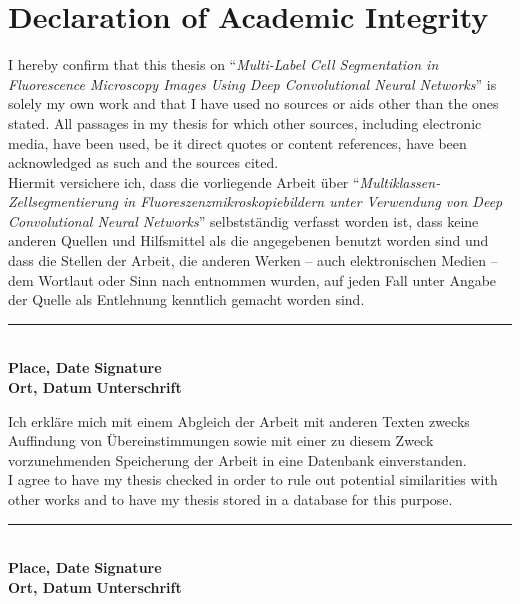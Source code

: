 \chapter* {Declaration of Academic Integrity}

I hereby confirm that this thesis on ``\textit{Multi-Label Cell Segmentation in Fluorescence Microscopy Images Using Deep Convolutional Neural Networks}'' is solely my own work and that I have used no sources or aids other than the ones stated. All passages in my thesis for which other sources, including electronic media, have been used, be it direct quotes or content references, have been acknowledged as such and the sources cited.\\

\noindent Hiermit versichere ich, dass die vorliegende Arbeit über ``\textit{Multi\-klassen-Zell\-segmen\-tierung in Fluoreszenzmikroskopiebildern unter Verwendung von Deep Convolutional Neural Networks}'' selbstständig verfasst worden ist, dass keine anderen Quellen und Hilfsmittel als die angegebenen benutzt worden sind und dass die Stellen der Arbeit, die anderen Werken – auch elektronischen Medien – dem Wortlaut oder Sinn nach entnommen wurden, auf jeden Fall unter Angabe der Quelle als Entlehnung kenntlich gemacht worden sind.\\[1.0cm]


\begin {flushleft}
	\rule{15cm}{0.4pt}\\
	\textbf{Place, Date} \hspace{4.1cm}\textbf{Signature}\\
	\noindent \textbf{Ort, Datum} \hspace{4cm}\textbf{Unterschrift}\\
\end {flushleft}
\vspace{1.0cm}

\noindent Ich erkläre mich mit einem Abgleich der Arbeit mit anderen Texten zwecks Auffindung von Übereinstimmungen sowie mit einer zu diesem Zweck vorzunehmenden Speicherung der Arbeit in eine Datenbank einverstanden.\\

\noindent I agree to have my thesis checked in order to rule out potential similarities with other works and to have my thesis stored in a database for this purpose.\\[1.0cm]


\begin {flushleft}
	\rule{15cm}{0.4pt}\\
	\textbf{Place, Date} \hspace{4.1cm}\textbf{Signature}\\
	\noindent \textbf{Ort, Datum} \hspace{4cm}\textbf{Unterschrift}\\
\end {flushleft}